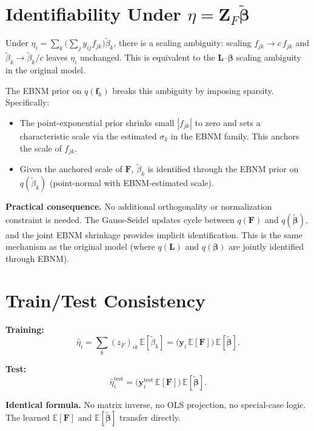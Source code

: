 \documentclass[11pt]{article}
\newcommand{\E}{\mathbb{E}}
\begin{document}
\section{Identifiability Under $\eta = \mathbf{Z}_F\tilde{\boldsymbol{\beta}}$}

\begin{derivbox}
Under $\eta_i = \sum_k \bigl(\sum_j y_{ij}f_{jk}\bigr)\tilde\beta_k$, there is a scaling
ambiguity: scaling $f_{jk} \to c\,f_{jk}$ and $\tilde\beta_k \to \tilde\beta_k/c$
leaves $\eta_i$ unchanged. This is equivalent to the $\mathbf{L}$--$\boldsymbol{\beta}$
scaling ambiguity in the original model.
\end{derivbox}

The EBNM prior on $q(\mathbf{f}_k)$ breaks this ambiguity by imposing sparsity. Specifically:
\begin{itemize}
  \item The point-exponential prior shrinks small $|f_{jk}|$ to zero and sets a characteristic
        scale via the estimated $\sigma_k$ in the EBNM family. This anchors the scale of $f_{jk}$.
  \item Given the anchored scale of $\mathbf{F}$, $\tilde\beta_k$ is identified through the
        EBNM prior on $q(\tilde\beta_k)$ (point-normal with EBNM-estimated scale).
\end{itemize}

\textbf{Practical consequence.} No additional orthogonality or normalization constraint is needed.
The Gauss-Seidel updates cycle between $q(\mathbf{F})$ and $q(\tilde{\boldsymbol{\beta}})$, and
the joint EBNM shrinkage provides implicit identification. This is the same mechanism as the
original model (where $q(\mathbf{L})$ and $q(\boldsymbol{\beta})$ are jointly identified through EBNM).

\section{Train/Test Consistency}

\begin{verifybox}[Train = Test formula]
\textbf{Training:}
\[
  \hat\eta_i = \sum_k (z_F)_{ik}\,\E[\tilde\beta_k]
             = \bigl(\mathbf{y}_i\,\E[\mathbf{F}]\bigr)\,\E[\tilde{\boldsymbol{\beta}}].
\]

\textbf{Test:}
\[
  \hat\eta_i^{\text{test}} = \bigl(\mathbf{y}_i^{\text{test}}\,\E[\mathbf{F}]\bigr)\,\E[\tilde{\boldsymbol{\beta}}].
\]

\textbf{Identical formula.} No matrix inverse, no OLS projection, no special-case logic.
The learned $\E[\mathbf{F}]$ and $\E[\tilde{\boldsymbol{\beta}}]$ transfer directly.
\end{verifybox}
\end{document}

